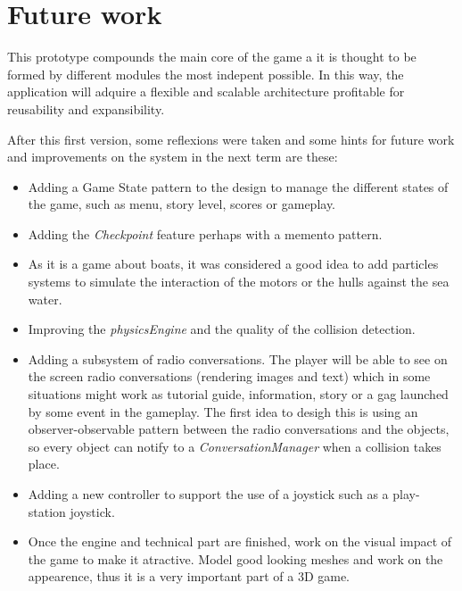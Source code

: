 \documentclass[]{article}
\begin{document}

\section{Future work}

This prototype compounds the main core of the game a it is thought to be formed by different modules the most indepent possible. In this way, the application will adquire a flexible and scalable architecture profitable for reusability and expansibility.

After this first version, some reflexions were taken and some hints for future work and improvements on the system in the next term are these:

\begin{itemize}
\item Adding a Game State pattern to the design to manage the different states of the game, such as menu, story level, scores or gameplay.
\item Adding the \emph{Checkpoint} feature perhaps with a memento pattern.
\item As it is a game about boats, it was considered a good idea to add particles systems to simulate the interaction of the motors or the hulls against the sea water.
\item Improving the \emph{physicsEngine} and the quality of the collision detection.
\item Adding a subsystem of radio conversations. The player will be able to see on the screen radio conversations (rendering images and text) which in some situations might work as tutorial guide, information, story or a gag launched by some event in the gameplay. The first idea to desigh this is using an observer-observable pattern between the radio conversations and the objects, so every object can notify to a \emph{ConversationManager} when a collision takes place.
\item Adding a new controller to support the use of a joystick such as a play-station joystick.
\item Once the engine and technical part are finished, work on the visual impact of the game to make it atractive. Model good looking meshes and work on the appearence, thus it is a very important part of a 3D game.
\end{itemize}
\end{document}
